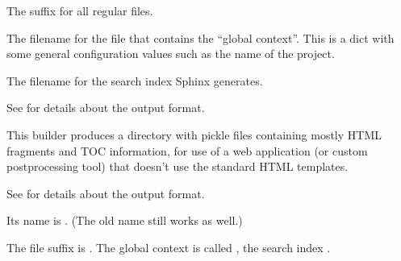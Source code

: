 \documentclass[letterpaper,10pt,english]{sphinxmanual}
\begin{document}
\begin{fulllineitems}
\begin{fulllineitems}
\label{builders:sphinx.builders.html.SerializingHTMLBuilder.out_suffix}
The suffix for all regular files.

\end{fulllineitems}


\begin{fulllineitems}
\label{builders:sphinx.builders.html.SerializingHTMLBuilder.globalcontext_filename}
The filename for the file that contains the ``global context''.  This
is a dict with some general configuration values such as the name
of the project.

\end{fulllineitems}


\begin{fulllineitems}
\label{builders:sphinx.builders.html.SerializingHTMLBuilder.searchindex_filename}
The filename for the search index Sphinx generates.

\end{fulllineitems}


See {\hyperref[builders:serialization\string-details]{}} for details about the output format.


\end{fulllineitems}


\begin{fulllineitems}
\label{builders:sphinx.builders.html.PickleHTMLBuilder}
This builder produces a directory with pickle files containing mostly HTML
fragments and TOC information, for use of a web application (or custom
postprocessing tool) that doesn't use the standard HTML templates.

See {\hyperref[builders:serialization\string-details]{}} for details about the output format.

Its name is .  (The old name  still works as well.)

The file suffix is .  The global context is called
, the search index .

\end{fulllineitems}
\end{document}

